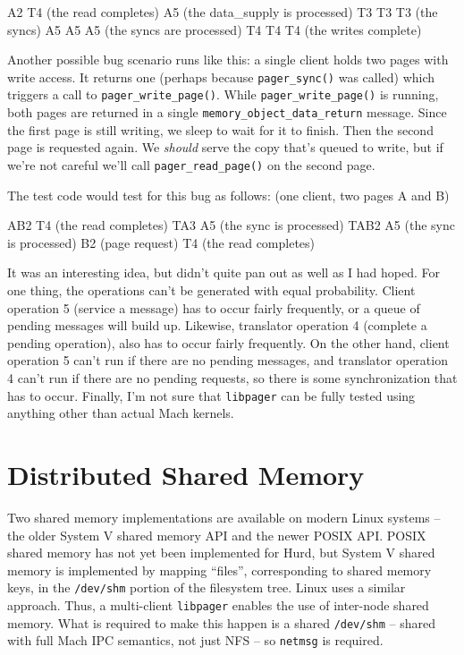 \documentclass{article}
\def\libpager{{\tt libpager}\xspace}
\def\netmsg{{\tt netmsg}\xspace}
\def\pagersync{{\tt pager_sync()}\xspace}
\def\pagerwritepage{{\tt pager_write_page()}\xspace}
\def\pagerreadpage{{\tt pager_read_page()}\xspace}
\def\moreturn{{\tt memory_object_data_return}\xspace}
\begin{document}
A2 T4 (the read completes) A5 (the data_supply is processed)
    T3 T3 T3 (the syncs) A5 A5 A5 (the syncs are processed) T4 T4 T4 (the writes complete)

Another possible bug scenario runs like this: a single client holds two
pages with write access.  It returns one (perhaps because \pagersync
was called) which triggers a call to \pagerwritepage.  While
\pagerwritepage is running, both pages are returned in a single
\moreturn message.  Since the first page is still writing, we
sleep to wait for it to finish.  Then the second page is requested
again.  We {\it should} serve the copy that's queued to write, but if
we're not careful we'll call \pagerreadpage on the second page.

The test code would test for this bug as follows: (one client, two pages A and B)

AB2 T4 (the read completes) TA3 A5 (the sync is processed) TAB2 A5 (the sync is processed)
B2 (page request) T4 (the read completes)

It was an interesting idea, but didn't quite pan out as well as I had
hoped.  For one thing, the operations can't be generated with equal
probability.  Client operation 5 (service a message) has to occur
fairly frequently, or a queue of pending messages will build up.
Likewise, translator operation 4 (complete a pending operation), also
has to occur fairly frequently.  On the other hand, client operation 5
can't run if there are no pending messages, and translator operation 4
can't run if there are no pending requests, so there is some
synchronization that has to occur.  Finally, I'm not sure that
\libpager can be fully tested using anything other than actual Mach
kernels.

\section{Distributed Shared Memory}

Two shared memory implementations are available on modern Linux
systems -- the older System V shared memory API and the newer POSIX
API.  POSIX shared memory has not yet been implemented for Hurd, but
System V shared memory is implemented by mapping ``files'',
corresponding to shared memory keys, in the {\tt /dev/shm} portion of
the filesystem tree.  Linux uses a similar approach.  Thus, a
multi-client \libpager enables the use of inter-node shared memory.
What is required to make this happen is a shared {\tt /dev/shm} --
shared with full Mach IPC semantics, not just NFS -- so \netmsg is
required.
\end{document}
